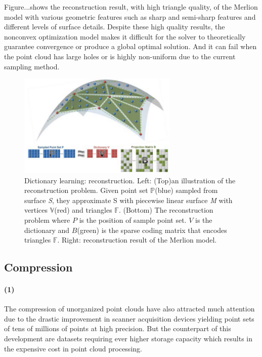 Figure...shows the reconstruction result, with high triangle quality, of the Merlion model with various geometric features such as sharp and semi-sharp features and different levels of surface details. Despite these high quality results, the nonconvex optimization model makes it difficult for the solver to theoretically guarantee convergence or produce a global optimal solution. And it can fail when the point cloud has large holes or is highly non-uniform due to the current sampling method.

\begin{figure}[ht]
  \centering
  \includegraphics[width=3in]{images/reconstruction_learning}
  \caption{Dictionary learning: reconstruction\cite{}. Left: (Top)an illustration of the reconstruction problem. Given point set $\mathbb{P}$(blue) sampled from surface \textsl{S}, they approximate S with piecewise linear surface \textsl{M} with vertices $\mathbb{V}$(red) and triangles $\mathbb{F}$. (Bottom) The reconstruction problem where $P$ is the position of sample point set. $V$ is the dictionary and $B$(green) is the sparse coding matrix that encodes triangles $\mathbb{F}$. Right: reconstruction result of the Merlion model.}
\end{figure}


\subsection{Compression}
\label{subsec:compression}

\paragraph{(1)}The compression of unorganized point clouds have also attracted much attention due to the drastic improvement in scanner acquisition devices yielding point sets of tens of millions of points at high precision. But the counterpart of this development are datasets requiring ever higher storage capacity which results in the expensive cost in point cloud processing.

